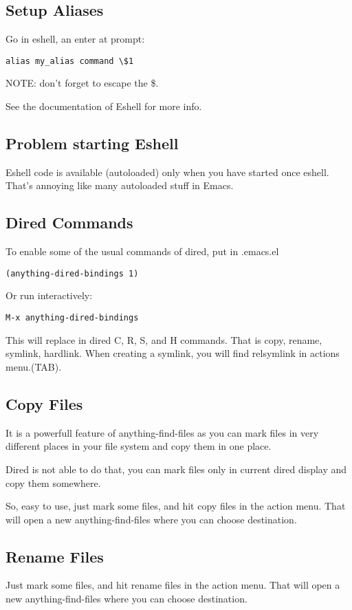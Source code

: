 \documentclass[a4paper,11pt]{article}
\begin{document}
\subsection{Setup Aliases}
\label{sec:setup-aliases}
Go in eshell, an enter at prompt:
\begin{verbatim}
alias my_alias command \$1
\end{verbatim}
NOTE: don't forget to escape the \$.

See the documentation of Eshell for more info.

\subsection{Problem starting Eshell}
\label{sec:probl-start-eshell}
Eshell code is available (autoloaded) only when you have started once eshell.
That's annoying like many autoloaded stuff in Emacs.
 
\subsection{Dired Commands}
\label{sec:dired-commands}
To enable some of the usual commands of dired, put in .emacs.el
\begin{verbatim}
(anything-dired-bindings 1)
\end{verbatim}
Or run interactively:
\begin{verbatim}
M-x anything-dired-bindings
\end{verbatim}
This will replace in dired C, R, S, and H commands.
That is copy, rename, symlink, hardlink.
When creating a symlink, you will find relsymlink in actions menu.(TAB).

\subsection{Copy Files}
\label{sec:copy-files}
It is a powerfull feature of anything-find-files as you can mark files in very different places in your
file system and copy them in one place.

Dired is not able to do that, you can mark files only in current dired display and copy them somewhere.

So, easy to use, just mark some files, and hit copy files in the action menu.
That will open a new anything-find-files where you can choose destination.
\subsection{Rename Files}
\label{sec:rename-files}
Just mark some files, and hit rename files in the action menu.
That will open a new anything-find-files where you can choose destination.
\end{document}
